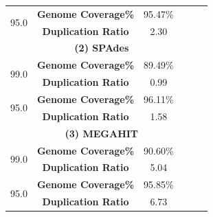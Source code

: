 \begin{table}[h]
\begin{tabular}{|c|c|c|c|c|c|}
\hline
\multirow{2}{*}{95.0}&\textbf{Genome  Coverage\%} &95.47\%&	 &&  \\   
&\textbf{Duplication Ratio} &2.30&	& &  \\   
\hline
\multicolumn{5}{|c|}{ \textbf{(2) SPAdes} }   \\ [0.5ex] %
\hline
\multirow{2}{*}{99.0}&\textbf{Genome Coverage\%}&89.49\% & & &\\
&\textbf{Duplication Ratio} &0.99&	 & & \\   
\hline
\multirow{2}{*}{95.0}&\textbf{Genome Coverage\%}& 96.11\% & & &\\
&\textbf{Duplication Ratio} &1.58&	 & & \\   
\hline
\multicolumn{5}{|c|}{ \textbf{(3) MEGAHIT} }    \\ [0.5ex] %
\hline
\multirow{2}{*}{99.0}&\textbf{Genome Coverage\%} &90.60\% & &  &\\
&\textbf{Duplication Ratio} &5.04&	 &&  \\   
\hline
\multirow{2}{*}{95.0}&\textbf{Genome Coverage\%} &95.85\% & &  &\\
&\textbf{Duplication Ratio} &6.73&	 &&  \\   
\hline
\end{tabular}
\label{table:coverage-analysis}
\end{table}


